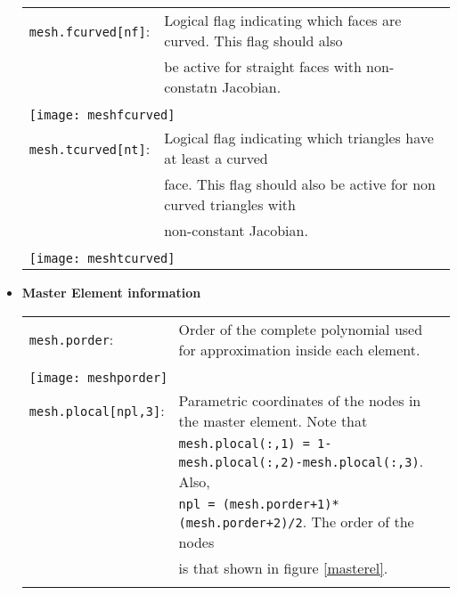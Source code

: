 \documentclass[11pt]{article}
\begin{document}
\begin{itemize}
\begin{tabular}{|ll}

	
	  
	  
       \texttt{mesh.fcurved[nf]}: & Logical flag indicating which faces are curved. This flag should also  \\ &  be active for straight faces with non-constatn Jacobian.\\ \\
       
        \multicolumn{2}{|l}{ \texttt{[image: meshfcurved]}} \\
        
       \texttt{mesh.tcurved[nt]}: & Logical flag indicating which triangles  have at least a curved \\ &  face. This flag should also be active for
       non curved triangles with \\ & non-constant Jacobian. \\   \\
              
        \multicolumn{2}{|l}{ \texttt{[image: meshtcurved]}} \\
        
\end{tabular}

\newpage 

\item {\bf Master Element information}

\begin{tabular}{|ll}
        \texttt{mesh.porder}: & Order of the complete polynomial used for approximation inside each element. \\  \\
        
        \multicolumn{2}{|l}{ \texttt{[image: meshporder]}} \\
        
	\texttt{mesh.plocal[npl,3]}: & Parametric coordinates of the nodes in the master element. Note that  \\ 
	& \texttt{mesh.plocal(:,1) = 1-mesh.plocal(:,2)-mesh.plocal(:,3)}. Also, \\ & \texttt{npl = (mesh.porder+1)*(mesh.porder+2)/2}. The order 
	of the nodes \\ &  is that shown  in figure \ref{masterel}. \\ \\
		 

\end{tabular}
\end{itemize}
\end{document}
